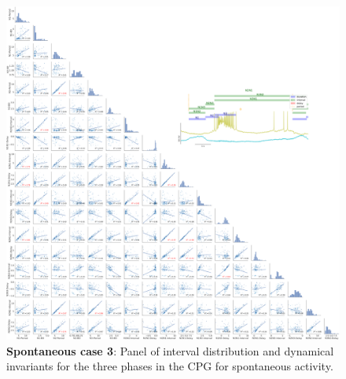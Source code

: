 \begin{figure}[htbp]
	\centering
	\includegraphics[width=\textwidth]{./img/invariants/data/SUSSEX/prep1/images/3phases/panel_with_pairplot.png}
	\caption{\textbf{Spontaneous case 3}: Panel of interval distribution and dynamical invariants for the three phases in the CPG for spontaneous activity.}
	\label{fig:prep1 invariants pairplot}
\end{figure}

%

